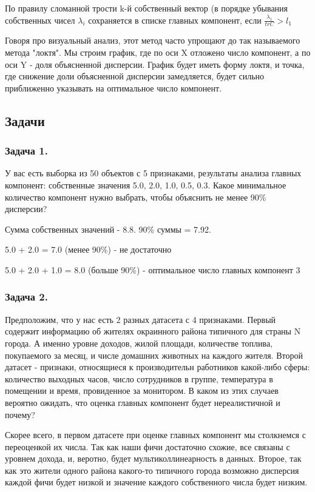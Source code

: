 По правилу сломанной трости k-й собственный вектор (в порядке убывания собственных чисел $\lambda _{i}$ сохраняется в списке главных компонент, если $\frac {\lambda _{1}}{tr C} >l_{1}$

Говоря про визуальный анализ, этот метод часто упрощают до так называемого метода "локтя". Мы строим график, где по оси X отложено число компонент, а по оси Y - доля объясненной дисперсии. График будет иметь форму локтя, и точка, где снижение доли объясненной дисперсии замедляется, будет сильно приближенно указывать на оптимальное число компонент.

\subsection{Задачи}
\subsubsection*{Задача 1.}

У вас есть выборка из 50 объектов с 5 признаками, результаты анализа главных компонент: собственные значения 5.0, 2.0, 1.0, 0.5, 0.3. Какое минимальное количество компонент нужно выбрать, чтобы объяснить не менее 90\% дисперсии?

\begin{solution}
    Сумма собственных значений - 8.8. 90\% суммы = 7.92.
    
    5.0 + 2.0 = 7.0 (менее 90\%) - не достаточно

    5.0 + 2.0 + 1.0 = 8.0 (больше 90\%) - оптимальное число главных компонент 3 
\end{solution}
\subsubsection*{Задача 2.}

Предположим, что у нас есть 2 разных датасета с 4 признаками. Первый содержит информацию об жителях окраинного района типичного для страны N города. А именно уровне доходов, жилой площади, количестве топлива, покупаемого за месяц, и числе домашних животных на каждого жителя. Второй датасет - признаки, относящиеся к производительн работников какой-либо сферы: количество выходных часов, число сотрудников в группе, температура в помещении и время, провиденное за монитором. В каком из этих случаев вероятно ожидать, что оценка главных компонент будет нереалистичной и почему?  

\begin{solution}
    Скорее всего, в первом датасете при оценке главных компонент мы столкнемся с переоценкой их числа. Так как наши фичи достаточно схожие, все связаны с уровнем дохода, и, веротно, будет мультиколлинеарность в данных. Второе, так как это жители одного района какого-то типичного города возможно дисперсия каждой фичи будет низкой и значение каждого собственного числа будет низким.
\end{solution}

